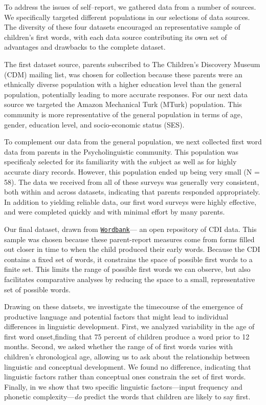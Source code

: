 \documentclass[10pt,letterpaper]{article}
\begin{document}
To address the issues of self--report, we gathered data from a number of sources. We specifically targeted different populations in our selections of data sources. The diversity of these four datasets encouraged an representative sample of children's first words, with each data source contributing its own set of advantages and drawbacks to the complete dataset. 

The first dataset source, parents subscribed to The Children's Discovery Museum (CDM) mailing list, was chosen for collection because these parents were an ethnically diverse population with a higher education level than the general population, potentially leading to more accurate responses. For our next data source we targeted the Amazon Mechanical Turk (MTurk) population. This community is more representative of the general population in terms of age, gender, education level, and socio-economic status (SES). 

To complement our data from the general population, we next collected first word data from parents in the Psycholinguistic community. This population was specificaly selected for its familiarity with the subject as well as for highly accurate diary records. However, this population ended up being very small (N = 58). The data we received from all of these surveys was generally very consistent, both within and across datasets, indicating that parents responded appropriately. In addition to yielding reliable data, our first word surveys were highly effective, and were completed quickly and with minimal effort by many parents. 

Our final dataset, drawn from \href{http://wordbank.stanford.edu}{\tt{Wordbank}}--- an open repository of CDI data. This sample was chosen because these parent-report measures come from forms filled out closer in time to when the child produced their early words. Because the CDI contains a fixed set of words, it constrains the space of possible first words to a finite set. This limits the range of possible first words we can observe, but also facilitates comparative analyses by reducing the space to a small, representative set of possible words.

Drawing on these datsets, we investigate the timecourse of the emergence of productive language and potential factors that might lead to individual differences in linguistic development. First, we analyzed variability in the age of first word onset,finding that 75 percent of children produce a word prior to 12 months. Second, we asked whether the range of of first words varies with children's chronological age, allowing us to ask about the relationship between linguistic and conceptual development. We found no difference, indicating that linguistic factors rather than conceptual ones constrain the set of first words. Finally, in we show that two specific linguistic factors---input frequency and phonetic complexity---\emph{do} predict the words that children are likely to say first.
\end{document}
